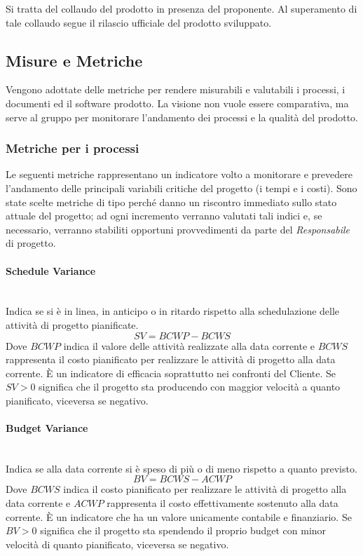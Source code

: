 			Si tratta del collaudo del prodotto in presenza del proponente. Al superamento di tale collaudo segue il rilascio ufficiale del prodotto sviluppato.
			
	
	\subsection{Misure e Metriche}
	\label{MisureMetriche}
	
	Vengono adottate delle metriche per rendere misurabili e valutabili i processi, i documenti ed il software prodotto. La visione non vuole essere comparativa, ma serve al gruppo per monitorare l'andamento dei processi e la qualità del prodotto.
		
		\subsubsection{Metriche per i processi}
		Le seguenti metriche rappresentano un indicatore volto a monitorare e prevedere l'andamento delle principali variabili critiche del progetto (i tempi e i costi). Sono state scelte metriche di tipo  perché danno un riscontro immediato sullo stato attuale del progetto; ad ogni incremento verranno valutati tali indici e, se necessario, verranno stabiliti opportuni provvedimenti da parte del \emph{Responsabile} di progetto.
		
			\paragraph{Schedule Variance} \mbox{} \\

			Indica se si è in linea, in anticipo o in ritardo rispetto alla schedulazione delle attività di progetto pianificate.
			\[
			SV = BCWP - BCWS
			\]
			Dove $BCWP$ indica il valore delle attività realizzate alla data corrente e $BCWS$ rappresenta il costo pianificato per realizzare le attività di progetto alla data corrente. 
			È un indicatore di efficacia soprattutto nei confronti del Cliente. Se $SV>0$ significa che il progetto sta producendo con maggior velocità a quanto pianificato, viceversa se negativo.
			
			\paragraph{Budget Variance}\mbox{} \\
			
			Indica se alla data corrente si è speso di più o di meno rispetto a quanto previsto.
			\[
			BV = BCWS - ACWP
			\]
			Dove $BCWS$ indica il costo pianificato per realizzare le attività di  progetto alla  data corrente e $ACWP$ rappresenta il costo effettivamente sostenuto alla data  corrente.
			È un indicatore che ha un valore unicamente contabile e finanziario. Se $BV>0$ significa che il progetto sta spendendo il proprio budget con minor velocità di quanto pianificato, viceversa se negativo. 

